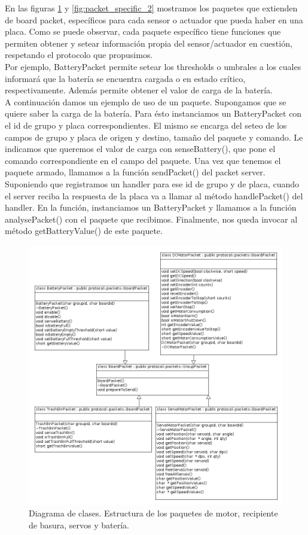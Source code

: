 En las figuras \ref{fig:packet_specific_1} y \ref{fig:packet_specific_2}
mostramos los paquetes que extienden de board packet, espec\'ificos para
cada sensor o actuador que pueda haber en una placa. Como se puede observar,
cada paquete espec\'ifico tiene funciones que permiten obtener y setear
informaci\'on propia del sensor/actuador en cuesti\'on, respetando el
protocolo que propusimos.
\\\indent
Por ejemplo, BatteryPacket permite setear los thresholds o
umbrales a los cuales informar\'a que la bater\'ia se encuentra cargada o
en estado cr\'itico, respectivamente. Adem\'as permite obtener el valor
de carga de la bater\'ia.
\\\indent
A continuaci\'on damos un ejemplo de uso de un paquete. Supongamos que se
quiere saber la carga de la bater\'ia. Para \'esto instanciamos un
BatteryPacket con el id de grupo y placa correspondientes. El mismo se
encarga del seteo de los campos de grupo y placa de origen y destino,
tama\~no del paquete y comando. Le indicamos que queremos el valor de carga
con senseBattery(), que pone el comando correspondiente en el campo del
paquete. Una vez que tenemos el paquete armado, llamamos a la funci\'on
sendPacket() del packet server. Suponiendo que registramos un handler para
ese id de grupo y de placa, cuando el server reciba la respuesta de la placa
va a llamar al m\'etodo handlePacket() del handler. En la funci\'on,
instanciamos un BatteryPacket y llamamos a la funci\'on analysePacket()
con el paquete que recibimos. Finalmente, nos queda invocar al m\'etodo
getBatteryValue() de este paquete.

\begin{figure}[ht]
	\centering
	\includegraphics[scale=0.52]{comportamientos/figures/cs2.png}
	\caption[Diagrama de clases: Estructura paquetes 1]{Diagrama de clases. Estructura de los paquetes de motor, recipiente de basura, servos y bater\'ia.}
	\label{fig:packet_specific_1}
\end{figure}

